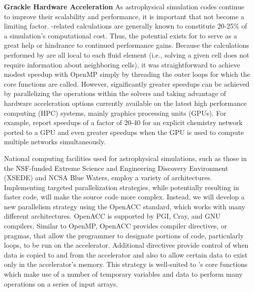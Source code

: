 \noindent \textbf{Grackle Hardware Acceleration}
As astrophysical simulation codes continue to improve their
scalability and performance, it is important that \grackle{} not
become a limiting factor.  \grackle{}-related calculations are
generally known to constitute 20-25\% of a simulation's computational
cost.  Thus, the potential exists for \grackle{} to serve as a great
help or hindrance to continued performance gains.  Because the
calculations performed by \grackle{} are all local to each fluid
element (i.e., solving a given cell does not require information about
neighboring cells), it was straightforward to achieve modest speedup
with OpenMP simply by threading the outer loops for which the core
functions are called.  However, significantly greater speedups can be
achieved by parallelizing the operations within the solvers and taking
advantage of hardware acceleration options currently available on the
latest high performance computing (HPC) systems, mainly graphics
processing units (GPUs). For example, \citet{Haidar2016PerformanceAA}
report speedups of a factor of 20-40 for an explicit chemistry network
ported to a GPU and even greater speedups when the GPU is used to
compute multiple networks simultaneously.

National computing facilities used for astrophysical simulations, such
as those in the NSF-funded Extreme Science and Engineering Discovery
Environment (XSEDE) and NCSA Blue Waters, employ a variety of
architectures.  Implementing targeted parallelization strategies,
while potentially resulting in faster code, will make the source code
more complex. Instead, we will develop a new parallelism strategy
using the OpenACC standard, which works with many different
architectures.  OpenACC is supported 
by PGI, Cray, and GNU compilers.  Similar to OpenMP, OpenACC provides
compiler directives, or pragmas, that allow the programmer to
designate portions of code, particularly loops, to be run on the
accelerator.  Additional directives provide control of when data is
copied to and from the accelerator and also to allow certain data to
exist only in the accelerator's memory.  This strategy is well-suited
to \grackle{}'s core functions which make use of a number of temporary
variables and data to perform many operations on a series of input
arrays.

